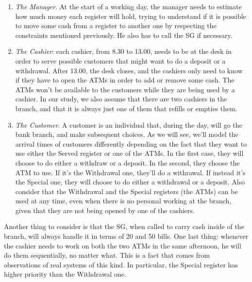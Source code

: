 \documentclass{article}
\begin{document}
\begin{enumerate}
    \item \emph{The Manager}. At the start of a working day, the manager needs to estimate how much money each register will hold, trying to understand if it is possible to move some cash from a register to another one by respecting the constraints mentioned previously. He also has to call the SG if necessary.
    \item \emph{The Cashier}: each cashier, from 8.30 to 13.00, needs to be at the desk in order to serve possible customers that might want to do a deposit or a withdrawal. After 13.00, the desk closes, and the cashiers only need to know if they have to open the ATMs in order to add or remove some cash. The ATMs won't be available to the customers while they are being used by a cashier. In our study, we also assume that there are two cashiers in the branch, and that it is always just one of them that refills or empties them.
    \item \emph{The Customer}. A customer is an individual that, during the day, will go the bank branch, and make subsequent choices. As we will see, we'll model the arrival times of customers differently depending on the fact that they want to use either the Served register or one of the ATMs. In the first case, they will choose to do either a withdraw or a deposit. In the second, they choose the ATM to use. If it's the Withdrawal one, they'll do a withrawal. If instead it's the Special one, they will choose to do either a withdrawal or a deposit. Also consider that the Withdrawal and the Special registers (the ATMs) can be used at any time, even when there is no personal working at the branch, given that they are not being opened by one of the cashiers. 
\end{enumerate}
Another thing to consider is that the SG, when called to carry cash inside of the branch, will always handle it in terms of 20 and 50 bills. One last thing: whenever the cashier needs to work on both the two ATMs in the same afternoon, he will do them sequentially, no matter what. This is a fact that comes from observations of real systems of this kind. In particular, the Special register has higher priority than the Withdrawal one. 
\end{document}
